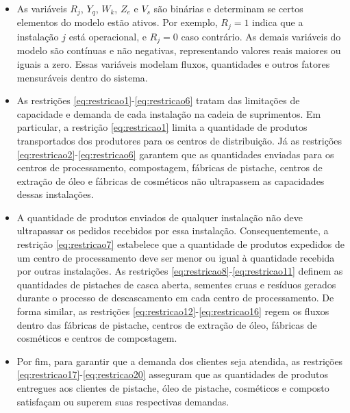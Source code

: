 \documentclass[a4paper]{ifacconf}
\begin{document}
\begin{itemize}
  \item As variáveis $R_j$, $Y_q$, $W_k$, $Z_e$ e $V_s$ são binárias e determinam se certos elementos do modelo estão ativos. Por exemplo, $R_j = 1$ indica que a instalação $j$ está operacional, e $R_j = 0$ caso contrário. As demais variáveis do modelo são contínuas e não negativas, representando valores reais maiores ou iguais a zero. Essas variáveis modelam fluxos, quantidades e outros fatores mensuráveis dentro do sistema.
  
  \item As restrições \eqref{eq:restricao1}-\eqref{eq:restricao6} tratam das limitações de capacidade e demanda de cada instalação na cadeia de suprimentos. Em particular, a restrição \eqref{eq:restricao1} limita a quantidade de produtos transportados dos produtores para os centros de distribuição. Já as restrições \eqref{eq:restricao2}-\eqref{eq:restricao6} garantem que as quantidades enviadas para os centros de processamento, compostagem, fábricas de pistache, centros de extração de óleo e fábricas de cosméticos não ultrapassem as capacidades dessas instalações.
  
  \item A quantidade de produtos enviados de qualquer instalação não deve ultrapassar os pedidos recebidos por essa instalação. Consequentemente, a restrição \eqref{eq:restricao7} estabelece que a quantidade de produtos expedidos de um centro de processamento deve ser menor ou igual à quantidade recebida por outras instalações. As restrições \eqref{eq:restricao8}-\eqref{eq:restricao11} definem as quantidades de pistaches de casca aberta, sementes cruas e resíduos gerados durante o processo de descascamento em cada centro de processamento. De forma similar, as restrições \eqref{eq:restricao12}-\eqref{eq:restricao16} regem os fluxos dentro das fábricas de pistache, centros de extração de óleo, fábricas de cosméticos e centros de compostagem.
  
  \item Por fim, para garantir que a demanda dos clientes seja atendida, as restrições \eqref{eq:restricao17}-\eqref{eq:restricao20} asseguram que as quantidades de produtos entregues aos clientes de pistache, óleo de pistache, cosméticos e composto satisfaçam ou superem suas respectivas demandas.
\end{itemize}

\end{document}
